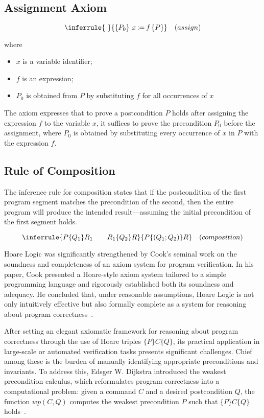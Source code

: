 \subsection{Assignment Axiom}

\[ 
  \inferrule
  { \ }
  {\{P_0\} \ \textit{x} := \textit{f} \ \{P\}}
  \quad (assign)
\]

where
\begin{itemize}
\item{$x$ is a variable identifier;}
\item{$f$ is an expression;}
\item{$P_0$ is obtained from $P$ by substituting $f$ for all occurrences of $x$}
\end{itemize}

The axiom expresses that to prove a postcondition $P$ holds after assigning the expression $f$ to the variable $x$,
it suffices to prove the precondition $P_0$ before the assignment, where $P_0$ is obtained by substituting every occurrence of
$x$ in $P$ with the expression $f$.

\subsection{Rule of Composition}

The inference rule for composition states that if the postcondition of the first program segment matches the precondition 
of the second, then the entire program will produce the intended result—assuming the initial precondition of the first 
segment holds.

\[ 
  \inferrule
  {P \{ Q_1 \} R_1 \quad \quad  R_1 \{ Q_2 \} R}
  {P \{ (Q_1 ; Q_2) \} R} 
  \quad (composition)
\]

Hoare Logic was significantly strengthened by Cook's seminal work on the soundness and completeness of an axiom system 
for program verification. In his paper, Cook presented a Hoare-style axiom system tailored to a simple programming language 
and rigorously established both its soundness and adequacy. He concluded that, under reasonable assumptions, Hoare Logic is 
not only intuitively effective but also formally complete as a system for reasoning about program correctness~\cite{0207005}.

After setting an elegant axiomatic framework for reasoning about program correctness through the use of Hoare triples 
$\{P\}C\{Q\}$, its practical application in large-scale or automated verification tasks presents significant challenges. 
Chief among these is the burden of manually identifying appropriate preconditions and invariants. To address this, 
Edsger W. Dijkstra introduced the weakest precondition calculus, which reformulates program correctness into a computational 
problem: given a command $C$ and a desired postcondition $Q$, the function $wp(C,Q)$ computes the weakest precondition $P$ 
such that $\{P\}C\{Q\}$ holds~\cite{Dijkstra76}.

